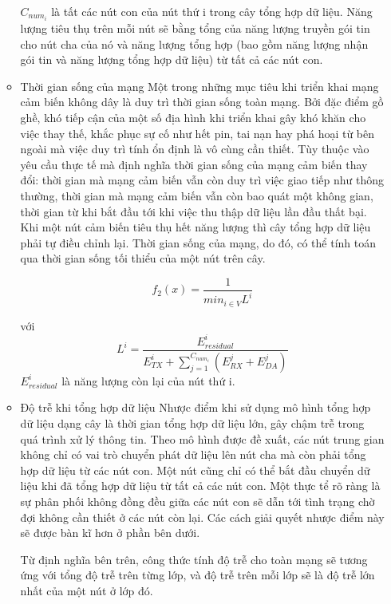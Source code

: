 \documentclass{hust}
\begin{document}
\begin{itemize}
\begin{itemize}
		$C_{num_i}$ là tất các nút con của nút thứ i trong cây tổng hợp dữ liệu. Năng lượng tiêu thụ trên mỗi nút sẽ bằng tổng của năng lượng truyền gói tin cho nút cha của nó và năng lượng tổng hợp (bao gồm năng lượng nhận gói tin và năng lượng tổng hợp dữ liệu) từ tất cả các nút con.
		
		\item{Thời gian sống của mạng}
		Một trong những mục tiêu khi triển khai mạng cảm biến không dây là duy trì thời gian sống toàn mạng. Bởi đặc điểm gồ ghề, khó tiếp cận của một số địa hình khi triển khai gây khó khăn cho việc thay thế, khắc phục sự cố như hết pin, tai nạn hay phá hoại từ bên ngoài mà việc duy trì tính ổn định là vô cùng cần thiết. Tùy thuộc vào yêu cầu thực tế mà định nghĩa thời gian sống của mạng cảm biến thay đổi: thời gian mà mạng cảm biến vẫn còn duy trì việc giao tiếp như thông thường, thời gian mà mạng cảm biến vẫn còn bao quát một không gian, thời gian từ khi bắt đầu tới khi việc thu thập dữ liệu lần đầu thất bại. Khi một nút cảm biến tiêu thụ hết năng lượng thì cây tổng hợp dữ liệu phải tự điều chỉnh lại. Thời gian sống của mạng, do đó, có thể tính toán qua thời gian sống tối thiểu của một nút trên cây.
		
		\begin{equation}
		f_2(x) = \frac{1}{min_{i \in V}  L^i}
		\end{equation}
		
		với
		\begin{equation}
		L^i = \frac{E^i_{residual}}{E^i_{TX} + \sum_{j=1}^{C_{num_i}} (E_{RX}^j + E_{DA}^j)}
		\end{equation}
		$E^i_{residual}$ là năng lượng còn lại của nút thứ i.
		
		\item{Độ trễ khi tổng hợp dữ liệu}
		Nhược điểm khi sử dụng mô hình tổng hợp dữ liệu dạng cây là thời gian tổng hợp dữ liệu lớn, gây chậm trễ trong quá trình xử lý thông tin. Theo mô hình được đề xuất, các nút trung gian không chỉ có vai trò chuyển phát dữ liệu lên nút cha mà còn phải tổng hợp dữ liệu từ các nút con. Một nút cũng chỉ có thể bắt đầu chuyển dữ liệu khi đã tổng hợp dữ liệu từ tất cả các nút con. Một thực tể rõ ràng là sự phân phối không đồng đều giữa các nút con sẽ dẫn tới tình trạng chờ đợi không cần thiết ở các nút còn lại. Các cách giải quyết nhược điểm này sẽ được bàn kĩ hơn ở phần bên dưới.
		
		Từ định nghĩa bên trên, công thức tính độ trễ cho toàn mạng sẽ tương ứng với tổng độ trễ trên từng lớp, và độ trễ trên mỗi lớp sẽ là độ trễ lớn nhất của một nút ở lớp đó.
		

\end{itemize}
\end{itemize}
\end{document}
